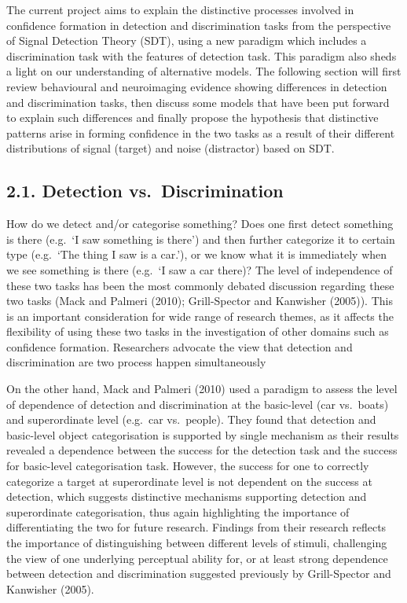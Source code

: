 \documentclass[
]{article}
\begin{document}
The current project aims to explain the distinctive processes involved
in confidence formation in detection and discrimination tasks from the
perspective of Signal Detection Theory (SDT), using a new paradigm which
includes a discrimination task with the features of detection task. This
paradigm also sheds a light on our understanding of alternative models.
The following section will first review behavioural and neuroimaging
evidence showing differences in detection and discrimination tasks, then
discuss some models that have been put forward to explain such
differences and finally propose the hypothesis that distinctive patterns
arise in forming confidence in the two tasks as a result of their
different distributions of signal (target) and noise (distractor) based
on SDT.

\hypertarget{detection-vs.-discrimination}{%
\subsection{2.1. Detection
vs.~Discrimination}\label{detection-vs.-discrimination}}

How do we detect and/or categorise something? Does one first detect
something is there (e.g.~`I saw something is there') and then further
categorize it to certain type (e.g.~`The thing I saw is a car.'), or we
know what it is immediately when we see something is there (e.g.~`I saw
a car there)? The level of independence of these two tasks has been the
most commonly debated discussion regarding these two tasks (Mack and
Palmeri (2010); Grill-Spector and Kanwisher (2005)). This is an
important consideration for wide range of research themes, as it affects
the flexibility of using these two tasks in the investigation of other
domains such as confidence formation. Researchers advocate the view that
detection and discrimination are two process happen simultaneously

On the other hand, Mack and Palmeri (2010) used a paradigm to assess the
level of dependence of detection and discrimination at the basic-level
(car vs.~boats) and superordinate level (e.g.~car vs.~people). They
found that detection and basic-level object categorisation is supported
by single mechanism as their results revealed a dependence between the
success for the detection task and the success for basic-level
categorisation task. However, the success for one to correctly
categorize a target at superordinate level is not dependent on the
success at detection, which suggests distinctive mechanisms supporting
detection and superordinate categorisation, thus again highlighting the
importance of differentiating the two for future research. Findings from
their research reflects the importance of distinguishing between
different levels of stimuli, challenging the view of one underlying
perceptual ability for, or at least strong dependence between detection
and discrimination suggested previously by Grill-Spector and Kanwisher
(2005).
\end{document}
